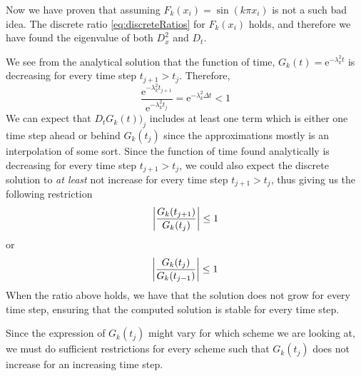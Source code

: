 \documentclass[12pt,english,a4paper]{article}
\renewcommand{\exp}[1]{\mathrm{e}^{#1}}
\begin{document}
Now we have proven that assuming \(F_k(x_i) = \sin(k\pi x_i)\) is not a such bad idea. The discrete ratio \vref{eq:discreteRatios} for \(F_k(x_i)\) holds, and therefore we have found the eigenvalue of both \(D_x^2\) and \(D_t\).

We see from the analytical solution that the function of time, \(G_k(t) = \exp{-\lambda_k^2 t}\) is decreasing for every time step \(t_{j+1} > t_j\). Therefore, 
\[
\frac{\exp{{-\lambda_k^2 t_{j+1}}}}{\exp{-\lambda_k^2 t_j}} = \exp{-\lambda_k^2\Delta t} < 1
\]
We can expect that \( D_tG_k(t))_j\) includes at least one term which is either one time step ahead or behind \(G_k(t_j)\) since the approximations mostly is an interpolation of some sort.
Since the function of time found analytically is decreasing for every time step \(t_{j+1} > t_j \), we could also expect the discrete solution to \textit{at least} not increase for every time step \(t_{j+1} > t_j \), thus giving us the following restriction 
\[
\abs{\frac{G_k(t_{j+1}) } {G_k(t_j) } }\leq 1
\]
or
\[
\abs{\frac{G_k(t_{j})}{G_k(t_{j-1})}} \leq 1
\]
When the ratio above holds, we have that the solution does not grow for every time step, ensuring that the computed solution is stable for every time step. 

Since the expression of \(G_k(t_{j})\) might vary for which scheme we are looking at, we must do sufficient restrictions for every scheme such that \(G_k(t_{j})\) does not increase for an increasing time step. 
\end{document}
